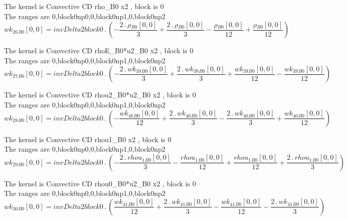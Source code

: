 \documentclass{article}
\begin{document}
\noindent The kernel is Convective CD rho_B0 x2 , block is 0\\\noindent The ranges are 0,block0np0,0,block0np1,0,block0np2\\\begin{dmath}{wk_{26}{_{B0}}}[{0,0}] = invDelta2block0 \,.\, \left(- \frac{2 \,.\, {\rho{_{B0}}}[{0,0}]}{3} + \frac{2 \,.\, {\rho{_{B0}}}[{0,0}]}{3} - \frac{{\rho{_{B0}}}[{0,0}]}{12} + \frac{{\rho{_{B0}}}[{0,0}]}{12}\right)\end{dmath}

\noindent The kernel is Convective CD rhoE_B0*u2_B0 x2 , block is 0\\\noindent The ranges are 0,block0np0,0,block0np1,0,block0np2\\\begin{dmath}{wk_{27}{_{B0}}}[{0,0}] = invDelta2block0 \,.\, \left(- \frac{2 \,.\, {wk_{39}{_{B0}}}[{0,0}]}{3} + \frac{2 \,.\, {wk_{39}{_{B0}}}[{0,0}]}{3} + \frac{{wk_{39}{_{B0}}}[{0,0}]}{12} - \frac{{wk_{39}{_{B0}}}[{0,0}]}{12}\right)\end{dmath}

\noindent The kernel is Convective CD rhou2_B0*u2_B0 x2 , block is 0\\\noindent The ranges are 0,block0np0,0,block0np1,0,block0np2\\\begin{dmath}{wk_{28}{_{B0}}}[{0,0}] = invDelta2block0 \,.\, \left(- \frac{{wk_{40}{_{B0}}}[{0,0}]}{12} + \frac{2 \,.\, {wk_{40}{_{B0}}}[{0,0}]}{3} - \frac{2 \,.\, {wk_{40}{_{B0}}}[{0,0}]}{3} + \frac{{wk_{40}{_{B0}}}[{0,0}]}{12}\right)\end{dmath}

\noindent The kernel is Convective CD rhou1_B0 x2 , block is 0\\\noindent The ranges are 0,block0np0,0,block0np1,0,block0np2\\\begin{dmath}{wk_{29}{_{B0}}}[{0,0}] = invDelta2block0 \,.\, \left(- \frac{2 \,.\, {rhou_{1}{_{B0}}}[{0,0}]}{3} - \frac{{rhou_{1}{_{B0}}}[{0,0}]}{12} + \frac{{rhou_{1}{_{B0}}}[{0,0}]}{12} + \frac{2 \,.\, {rhou_{1}{_{B0}}}[{0,0}]}{3}\right)\end{dmath}

\noindent The kernel is Convective CD rhou0_B0*u2_B0 x2 , block is 0\\\noindent The ranges are 0,block0np0,0,block0np1,0,block0np2\\\begin{dmath}{wk_{30}{_{B0}}}[{0,0}] = invDelta2block0 \,.\, \left(\frac{{wk_{41}{_{B0}}}[{0,0}]}{12} + \frac{2 \,.\, {wk_{41}{_{B0}}}[{0,0}]}{3} - \frac{{wk_{41}{_{B0}}}[{0,0}]}{12} - \frac{2 \,.\, {wk_{41}{_{B0}}}[{0,0}]}{3}\right)\end{dmath}
\end{document}
